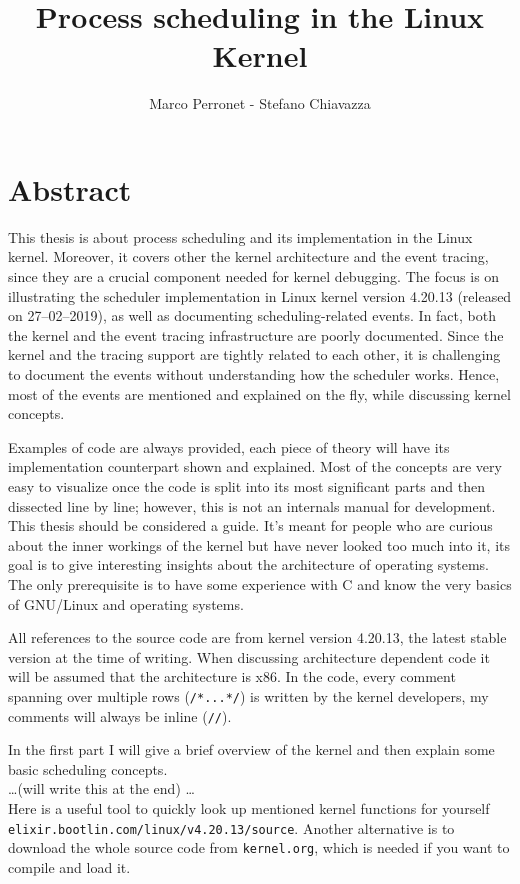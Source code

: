 \documentclass[10pt, oneside]{book}
\author{Marco Perronet - Stefano Chiavazza}
\title{Process scheduling in the Linux Kernel}
\begin{document}
\frontmatter

\begin{titlepage}
\maketitle  
\end{titlepage}

\tableofcontents

\chapter{Abstract}
This thesis is about process scheduling and its implementation in the Linux kernel. Moreover, it covers other the kernel architecture and the event tracing, since they are a crucial component needed for kernel debugging. %
The focus is on illustrating the scheduler implementation in Linux kernel version 4.20.13 (released on 27--02--2019), as well as documenting scheduling-related events. In fact, both the kernel and the event tracing infrastructure are poorly documented.
Since the kernel and the tracing support are tightly related to each other, it is challenging to document the events without understanding how the scheduler works. Hence, most of the events are mentioned and explained on the fly, while discussing kernel concepts.

Examples of code are always provided, each piece of theory will have its implementation counterpart shown and explained.
Most of the concepts are very easy to visualize once the code is split into its most significant parts
and then dissected line by line; however, this is not an internals manual for development. 
This thesis should be considered a guide. It's meant for people who are curious about the inner workings of the kernel
but have never looked too much into it, its goal is to give interesting insights about the architecture of operating systems.
The only prerequisite is to have some experience with C and know the very basics of GNU/Linux and operating systems.

All references to the source code are from kernel version 4.20.13, the latest stable version at the time of writing. When discussing architecture dependent code it will be assumed that the architecture is x86. In the code, every comment spanning over multiple rows (\verb|/*...*/|) is written by the kernel developers, my comments will always be inline (\verb|//|).

In the first part I will give a brief overview of the kernel and then explain some basic scheduling concepts.\\
\dots (will write this at the end)
\dots\\
Here is a useful tool to quickly look up mentioned kernel functions for yourself \texttt{elixir.bootlin.com/linux/v4.20.13/source}. Another alternative is to download the whole source code from \texttt{kernel.org}, which is needed if you want to compile and load it. 
\end{document}

